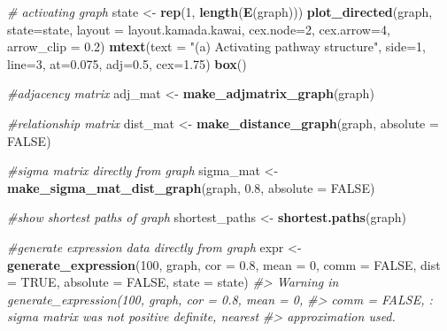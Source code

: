 \documentclass[]{article}
\newenvironment{Shaded}{\begin{snugshade}}{\end{snugshade}}
\newcommand{\CommentTok}[1]{\textcolor[rgb]{0.56,0.35,0.01}{\textit{#1}}}
\newcommand{\DataTypeTok}[1]{\textcolor[rgb]{0.13,0.29,0.53}{#1}}
\newcommand{\DecValTok}[1]{\textcolor[rgb]{0.00,0.00,0.81}{#1}}
\newcommand{\FloatTok}[1]{\textcolor[rgb]{0.00,0.00,0.81}{#1}}
\newcommand{\KeywordTok}[1]{\textcolor[rgb]{0.13,0.29,0.53}{\textbf{#1}}}
\newcommand{\NormalTok}[1]{#1}
\newcommand{\OtherTok}[1]{\textcolor[rgb]{0.56,0.35,0.01}{#1}}
\newcommand{\StringTok}[1]{\textcolor[rgb]{0.31,0.60,0.02}{#1}}
\begin{document}
\begin{Shaded}
\begin{Highlighting}[]
\CommentTok{# activating graph}
\NormalTok{state <-}\StringTok{ }\KeywordTok{rep}\NormalTok{(}\DecValTok{1}\NormalTok{, }\KeywordTok{length}\NormalTok{(}\KeywordTok{E}\NormalTok{(graph)))}
\KeywordTok{plot_directed}\NormalTok{(graph, }\DataTypeTok{state=}\NormalTok{state, }\DataTypeTok{layout =}\NormalTok{ layout.kamada.kawai,}
              \DataTypeTok{cex.node=}\DecValTok{2}\NormalTok{, }\DataTypeTok{cex.arrow=}\DecValTok{4}\NormalTok{, }\DataTypeTok{arrow_clip =} \FloatTok{0.2}\NormalTok{)}
\KeywordTok{mtext}\NormalTok{(}\DataTypeTok{text =} \StringTok{"(a) Activating pathway structure"}\NormalTok{, }\DataTypeTok{side=}\DecValTok{1}\NormalTok{, }\DataTypeTok{line=}\DecValTok{3}\NormalTok{, }\DataTypeTok{at=}\FloatTok{0.075}\NormalTok{, }\DataTypeTok{adj=}\FloatTok{0.5}\NormalTok{, }\DataTypeTok{cex=}\FloatTok{1.75}\NormalTok{)}
\KeywordTok{box}\NormalTok{()}

\CommentTok{#adjacency matrix}
\NormalTok{adj_mat <-}\StringTok{ }\KeywordTok{make_adjmatrix_graph}\NormalTok{(graph)}

\CommentTok{#relationship matrix}
\NormalTok{dist_mat <-}\StringTok{ }\KeywordTok{make_distance_graph}\NormalTok{(graph, }\DataTypeTok{absolute =} \OtherTok{FALSE}\NormalTok{)}

\CommentTok{#sigma matrix directly from graph}
\NormalTok{sigma_mat <-}\StringTok{ }\KeywordTok{make_sigma_mat_dist_graph}\NormalTok{(graph, }\FloatTok{0.8}\NormalTok{, }\DataTypeTok{absolute =} \OtherTok{FALSE}\NormalTok{)}

\CommentTok{#show shortest paths of graph}
\NormalTok{shortest_paths <-}\StringTok{ }\KeywordTok{shortest.paths}\NormalTok{(graph)}

\CommentTok{#generate expression data directly from graph}
\NormalTok{expr <-}\StringTok{ }\KeywordTok{generate_expression}\NormalTok{(}\DecValTok{100}\NormalTok{, graph, }\DataTypeTok{cor =} \FloatTok{0.8}\NormalTok{, }\DataTypeTok{mean =} \DecValTok{0}\NormalTok{, }\DataTypeTok{comm =} \OtherTok{FALSE}\NormalTok{,}
                            \DataTypeTok{dist =} \OtherTok{TRUE}\NormalTok{, }\DataTypeTok{absolute =} \OtherTok{FALSE}\NormalTok{, }\DataTypeTok{state =}\NormalTok{ state)}
\CommentTok{#> Warning in generate_expression(100, graph, cor = 0.8, mean = 0,}
\CommentTok{#> comm = FALSE, : sigma matrix was not positive definite, nearest}
\CommentTok{#> approximation used.}


\end{Highlighting}
\end{Shaded}
\end{document}

